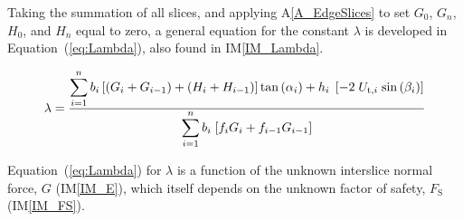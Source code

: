 \documentclass[12pt]{article}
\newcommand{\aref}[1]{A\ref{#1}}
\newcommand{\iref}[1]{IM\ref{#1}}
\begin{document}
\noindent
Taking the summation of all slices, and applying \aref{A_EdgeSlices} to set 
$G_{\text{0}}$, $G_n$, $H_{\text{0}}$, and $H_n$ equal to zero, a general 
equation for the constant $\lambda$ is developed in Equation~(\ref{eq:Lambda}), 
also found in \iref{IM_Lambda}.

\begin{equation}\label{eq:Lambda}
\lambda= \frac{ \displaystyle\sum_{i=1}^{n} { {b_{i}} \left[
      \left({{G}_{i} + {G}_{i-1}}\right) +
      \left({{H}_{i} + {H}_{i-1}}\right)
      \right]{\tan\left(\alpha_{i}\right)} \\ +
    {{h}_{i}}\;\left[ 
    -{2}\;{U_{\text{t,}i}}\;{\sin\left(\beta_{i}\right)} \right] }}
         {\displaystyle\sum_{i=1}^{n} { {{b}_{i}}\;{\left[{
                   {f_{i}}{{G}_{i}} +
                   {f_{i-1}}{{G}_{i-1}} }\right]} }}
\end{equation}

\noindent
Equation~(\ref{eq:Lambda}) for $\lambda$ is a function of the unknown
interslice normal force, $G$ (\iref{IM_E}), which itself depends on the unknown 
factor of safety, $F_\text{S}$ (\iref{IM_FS}).

~\newline

\end{document}
